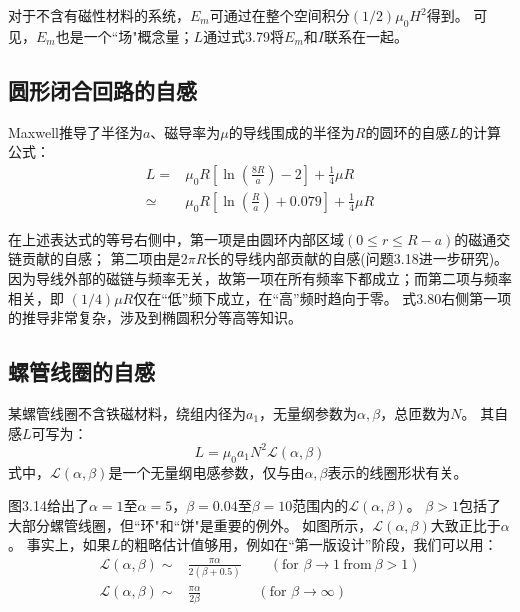 对于不含有磁性材料的系统，$E_m$可通过在整个空间积分$(1/2)\mu_0 H^2$得到。
可见，$E_m$也是一个``场"概念量；$L$通过式3.79将$E_m$和$I$联系在一起。

\subsection{圆形闭合回路的自感}
Maxwell推导了半径为$a$、磁导率为$\mu$的导线围成的半径为$R$的圆环的自感$L$的计算公式：
\begin{subequations}
	\begin{align}
L=&\mu_0R\left[\ln\left(\frac{8R}{a}\right)-2\right]+\frac{1}{4}\mu R \\
\simeq & \mu_0R\left[\ln\left(\frac{R}{a}\right)+0.079\right]+\frac{1}{4}\mu R%
	\end{align}
\end{subequations}

在上述表达式的等号右侧中，第一项是由圆环内部区域$(0\le r \le R-a)$的磁通交链贡献的自感；
第二项由是$2\pi R$长的导线内部贡献的自感(问题3.18进一步研究)。
因为导线外部的磁链与频率无关，故第一项在所有频率下都成立；而第二项与频率相关，即
$(1/4)\mu R$仅在``低''频下成立，在``高''频时趋向于零。
式3.80右侧第一项的推导非常复杂，涉及到椭圆积分等高等知识。

\subsection{螺管线圈的自感}
某螺管线圈不含铁磁材料，绕组内径为$a_1$，无量纲参数为$\alpha,\beta$，总匝数为$N$。
其自感$L$可写为：
\begin{equation}
L=\mu_0a_1N^2\mathcal{L}(\alpha,\beta)%
\end{equation}
式中，$\mathcal{L}(\alpha,\beta)$是一个无量纲电感参数，仅与由$\alpha,\beta$表示的线圈形状有关。

图3.14给出了$\alpha=1$至$\alpha=5$，$\beta=0.04$至$\beta=10$范围内的$\mathcal{L}(\alpha,\beta)$。
$\beta>1$包括了大部分螺管线圈，但``环"和``饼"是重要的例外。
如图所示，$\mathcal{L}(\alpha,\beta)$大致正比于$\alpha$。
事实上，如果$L$的粗略估计值够用，例如在``第一版设计''阶段，我们可以用：
\begin{subequations}
	\begin{align}
\mathcal{L}(\alpha,\beta)\sim&\frac{\pi\alpha}{2(\beta+0.5)} \qquad(\mbox{for } \beta\rightarrow 1\ \mbox{from}\ \beta>1)\\ 
\mathcal{L}(\alpha,\beta)\sim&\frac{\pi\alpha}{2\beta}\qquad\qquad (\mbox{for } \beta\rightarrow \infty)
	\end{align}
\end{subequations}

